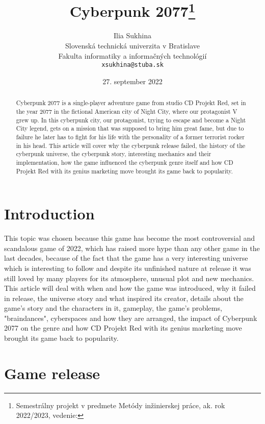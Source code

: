 \documentclass[10pt,twoside,english,a4paper]{article}
\title{Cyberpunk 2077\thanks{Semestrálny projekt v predmete Metódy inžinierskej práce, ak. rok 2022/2023, vedenie: }} %
\author{Ilia Sukhina\\[2pt]
	{\small Slovenská technická univerzita v Bratislave}\\
	{\small Fakulta informatiky a informačných technológií}\\
	{\small \texttt{xsukhina@stuba.sk}}
	}
\date{\small 27. september 2022} %
\begin{document}
\maketitle

\begin{abstract}
	Cyberpunk 2077 is a single-player adventure game from studio CD Projekt Red, set in the year 2077 in the fictional American city of Night City, where our protagonist V grew up. In this cyberpunk city, our protagonist, trying to escape and become a Night City legend, gets on a mission that was supposed to bring him great fame, but due to failure he later has to fight for his life with the personality of a former terrorist rocker in his head. This article will cover why the cyberpunk release failed, the history of the cyberpunk universe, the cyberpunk story, interesting mechanics and their implementation, how the game influenced the cyberpunk genre itself and how CD Projekt Red with its genius marketing move brought its game back to popularity.
\end{abstract}



\section{Introduction}

This topic was chosen because this game has become the most controversial and scandalous game of 2022, which has raised more hype than any other game in the last decades, because of the fact that the game has a very interesting universe which is interesting to follow and despite its unfinished nature at release it was still loved by many players for its atmosphere, unusual plot and new mechanics.  This article will deal with when and how the game was introduced, why it failed in release, the universe story and what inspired its creator, details about the game's story and the characters in it, gameplay, the game's problems, "braindances", cyberspaces and how they are arranged, the impact of Cyberpunk 2077 on the genre and how CD Projekt Red with its genius marketing move brought its game back to popularity.


\section{Game release} \label{game release}
\end{document}
